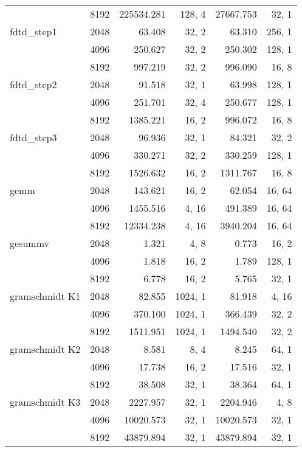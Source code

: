 \begin{table}
\begin{tabular}{lr|rr|rr}
& 8192 &  225534.281 &  128, 4 &  27667.753 &     32, 1 \\
fdtd\_step1 
& 2048 &      63.408 &   32, 2 &      63.310 &     256, 1 \\
& 4096 &      250.627 &  32, 2 &      250.302 &    128, 1 \\
& 8192 &      997.219 &  32, 2 &      996.090 &     16, 8 \\
fdtd\_step2 
& 2048 &      91.518 &   32, 1 &      63.998 &     128, 1 \\
& 4096 &      251.701 &  32, 4 &      250.677 &    128, 1 \\
& 8192 &      1385.221 &  16, 2 &     996.072 &    16, 8 \\
fdtd\_step3 
& 2048 &      96.936 &   32, 1 &      84.321 &     32, 2 \\
& 4096 &      330.271 &  32, 2 &      330.259 &    128, 1 \\
& 8192 &      1526.632 &  16, 2 &     1311.767 &   16, 8 \\
gemm 
& 2048 &      143.621 &   16, 2 &      62.054 &     16, 64 \\
& 4096 &    1455.516 &  4, 16 &    491.389 &    16, 64 \\
& 8192 &   12334.238 &  4, 16 &   3940.204 &    16, 64 \\
gesummv 
& 2048 &      1.321 &   4, 8 &      0.773 &     16, 2 \\
& 4096 &      1.818 &   16, 2 &     1.789 &     128, 1 \\
& 8192 &     6.778 &  16, 2 &     5.765 &     32, 1 \\
gramschmidt K1 
& 2048 &      82.855 &   1024, 1 &      81.918 &     4, 16 \\
& 4096 &      370.100 &   1024, 1 &     366.439 &    32, 2 \\
& 8192 &      1511.951 &   1024, 1 &    1494.540 &   32, 2 \\
gramschmidt K2 
& 2048 &      8.581 &   8, 4 &      8.245 &     64, 1 \\
& 4096 &      17.738 &   16, 2 &     17.516 &   32, 1 \\
& 8192 &      38.508 &  32, 1 &      38.364 &   64, 1 \\
gramschmidt K3 
& 2048 &      2227.957 &   32, 1 &   2204.946 &    4, 8 \\
& 4096 &      10020.573 &  32, 1 &   10020.573 &     32, 1 \\
& 8192 &      43879.894 &  32, 1 &   43879.894 &     32, 1 \\

\end{tabular}
\end{table}
